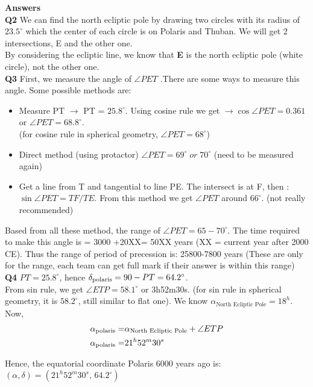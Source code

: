 \documentclass[a4paper,12pt]{extarticle}
\begin{document}
\textbf{Answers}\\
\textbf{Q2} We can find the north ecliptic pole by drawing two circles with its radius of $23.5^\circ$ which the center of each circle is on Polaris and Thuban. We will get 2 intersections, E and the other one.\\
By considering the ecliptic line, we know that \textbf{E} is the north ecliptic pole (white circle), not the other one.\\

\textbf{Q3} First, we measure the angle of $\angle PET$ .There are some ways to measure this angle. Some possible methods are:
\begin{itemize}
	\item Measure PT $\rightarrow$ PT = $25.8^\circ$.
	Using cosine rule we get $\rightarrow \cos\angle PET =0.361$ or $\angle PET= 68.8^\circ$.\\
	(for cosine rule in spherical geometry, $\angle PET= 68^\circ$)
	\item Direct method (using protactor) $\angle PET= 69^\circ\; or \; 70^\circ$ (need to be measured again)
	\item Get a line from T and tangential to line PE. The intersect is at F, then : $\sin\angle PET = TF/TE$. From this method we get $\angle PET$ around $66^\circ$. (not really recommended)
\end{itemize}

Based from all these method, the range of $\angle PET= 65 -70^\circ$.
The time required to make this angle is = 3000 +20XX= 50XX years (XX = current year after 2000 CE). Thus the range of period of precession is: 25800-7800 years (These are only for the range, each team can get full mark if their answer is within this range)\\

\textbf{Q4}  $PT=25.8^\circ$, hence $\delta_{\rm polaris} = 90-PT =64.2^\circ$.\\

From sin rule, we get $\angle ETP = 58.1^\circ$ or 3h52m30s. (for sin rule in spherical geometry, it is $58.2^\circ$, still similar to flat one). We know $\alpha_{\text{North Ecliptic Pole}}=18^h$. Now, 
\begin{align*}
	\alpha_{\rm polaris}=& \alpha_{\text{North Ecliptic Pole}}+ \angle ETP\\
	\alpha_{\rm polaris}=& 21^h52^m30^s
\end{align*}

Hence, the equatorial coordinate Polaris 6000 years ago is: $(\alpha, \delta)= (21^h 52^m 30^s,\, 64.2^\circ)$
\end{document}
